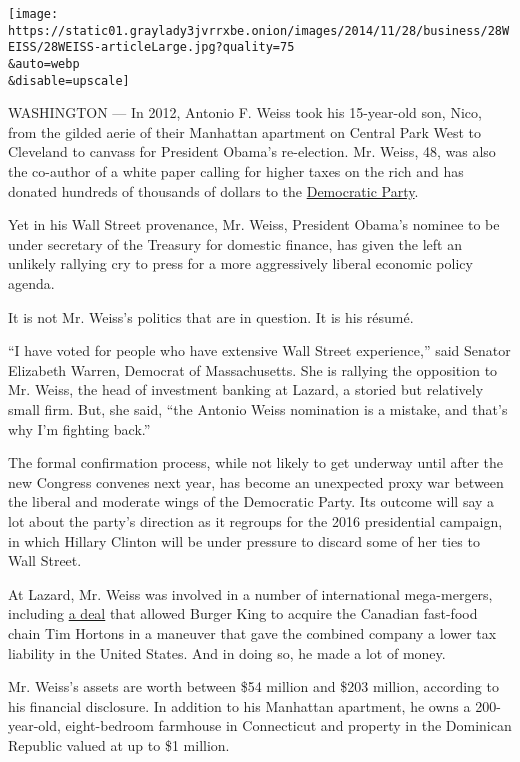 \texttt{[image: https://static01.graylady3jvrrxbe.onion/images/2014/11/28/business/28WEISS/28WEISS-articleLarge.jpg?quality=75\\\&auto=webp\\\&disable=upscale]}

WASHINGTON --- In 2012, Antonio F. Weiss took his 15-year-old son, Nico,
from the gilded aerie of their Manhattan apartment on Central Park West
to Cleveland to canvass for President Obama's re-election. Mr. Weiss,
48, was also the co-author of a white paper calling for higher taxes on
the rich and has donated hundreds of thousands of dollars to the
\href{http://topics.nytimes3xbfgragh.onion/top/reference/timestopics/organizations/d/democratic_party/index.html?inline=nyt-org}{Democratic
Party}.

Yet in his Wall Street provenance, Mr. Weiss, President Obama's nominee
to be under secretary of the Treasury for domestic finance, has given
the left an unlikely rallying cry to press for a more aggressively
liberal economic policy agenda.

It is not Mr. Weiss's politics that are in question. It is his résumé.

``I have voted for people who have extensive Wall Street experience,''
said Senator Elizabeth Warren, Democrat of Massachusetts. She is
rallying the opposition to Mr. Weiss, the head of investment banking at
Lazard, a storied but relatively small firm. But, she said, ``the
Antonio Weiss nomination is a mistake, and that's why I'm fighting
back.''

The formal confirmation process, while not likely to get underway until
after the new Congress convenes next year, has become an unexpected
proxy war between the liberal and moderate wings of the Democratic
Party. Its outcome will say a lot about the party's direction as it
regroups for the 2016 presidential campaign, in which Hillary Clinton
will be under pressure to discard some of her ties to Wall Street.

At Lazard, Mr. Weiss was involved in a number of international
mega-mergers, including
\href{http://dealbook.nytimes3xbfgragh.onion/2014/08/26/burger-king-to-buy-tim-hortons-for-11-4-billion}{a
deal} that allowed Burger King to acquire the Canadian fast-food chain
Tim Hortons in a maneuver that gave the combined company a lower tax
liability in the United States. And in doing so, he made a lot of money.

Mr. Weiss's assets are worth between \$54 million and \$203 million,
according to his financial disclosure. In addition to his Manhattan
apartment, he owns a 200-year-old, eight-bedroom farmhouse in
Connecticut and property in the Dominican Republic valued at up to \$1
million.


